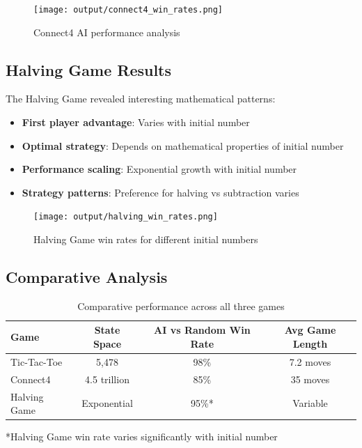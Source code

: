 \documentclass[12pt]{article}
\begin{document}
\begin{figure}[H]
\centering
\texttt{[image: output/connect4\_win\_rates.png]}
\caption{Connect4 AI performance analysis}
\label{fig:connect4_win_rates}
\end{figure}

\subsection{Halving Game Results}

The Halving Game revealed interesting mathematical patterns:
\begin{itemize}
    \item \textbf{First player advantage}: Varies with initial number
    \item \textbf{Optimal strategy}: Depends on mathematical properties of initial number
    \item \textbf{Performance scaling}: Exponential growth with initial number
    \item \textbf{Strategy patterns}: Preference for halving vs subtraction varies
\end{itemize}

\begin{figure}[H]
\centering
\texttt{[image: output/halving\_win\_rates.png]}
\caption{Halving Game win rates for different initial numbers}
\label{fig:halving_win_rates}
\end{figure}

\subsection{Comparative Analysis}

\begin{table}[H]
\centering
\begin{tabular}{lccc}
\toprule
\textbf{Game} & \textbf{State Space} & \textbf{AI vs Random Win Rate} & \textbf{Avg Game Length} \\
\midrule
Tic-Tac-Toe & 5,478 & 98\% & 7.2 moves \\
Connect4 & 4.5 trillion & 85\% & 35 moves \\
Halving Game & Exponential & 95\%* & Variable \\
\bottomrule
\end{tabular}
\caption{Comparative performance across all three games}
\label{tab:comparison}
\end{table}

*Halving Game win rate varies significantly with initial number
\end{document}
